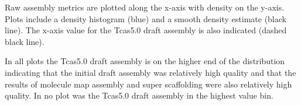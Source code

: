 Raw assembly metrics are plotted along the x-axis with density on the y-axis. Plots include a density histogram (blue) and a smooth density estimate (black line). The x-axis value for the Tcas5.0 draft assembly is also indicated (dashed black line).

In all plots the Tcas5.0 draft assembly is on the higher end of the distribution indicating that the initial draft assembly was relatively high quality and that the results of molecule map assembly and super scaffolding were also relatively high quality. In no plot was the Tcas5.0 draft assembly in the highest value bin.